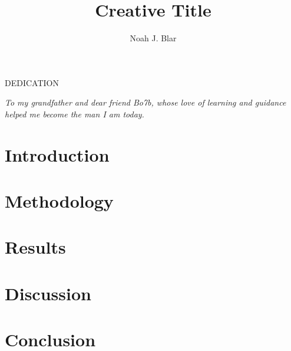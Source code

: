 \documentclass[master]{thesis}
\title{Creative Title}
\author{Noah J. Blar}
\begin{document}
 
    \frontmatter 
    \maketitle              %
    \makemycopyright        %
    \makeabstract           %
    \makeacknowledgements   %
    \begin{flatcenter} %

        DEDICATION

        \vfill %

        \noindent \textit{To my grandfather and dear friend Bo7b, whose love of learning and guidance helped me become the man I am today.}
        \vfill %
    \end{flatcenter}
    \newpage
    \setcounter{tocdepth}{1}
    \tableofcontents    %
    \listoftables       %
    \listoffigures      %

    \mainmatter %

    \chapter{Introduction}\label{toc:ch.introduction}
    
    \chapter{Methodology}\label{toc:ch.methodology}
    
    \chapter{Results}\label{toc:ch.results}
    
    \chapter{Discussion}\label{toc:ch.discussion}
    
    \chapter{Conclusion}\label{toc:ch.conclusion}
    
    \backmatter
    
    
\end{document}
